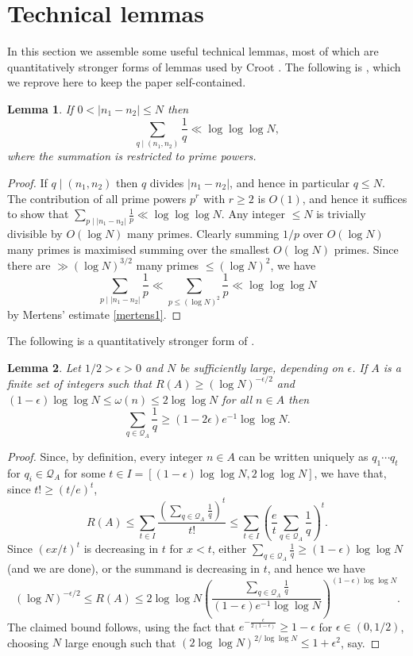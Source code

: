 \documentclass{amsart}
\newcommand{\abs}[1]{\left\lvert #1\right\rvert}
\newcommand{\brac}[1]{\left( #1\right)}
\newtheorem{lemma}{Lemma}
\begin{document}
\section{Technical lemmas}
In this section we assemble some useful technical lemmas, most of which are quantitatively stronger forms of lemmas used by Croot \cite{Cr2003}. The following is \cite[Lemma 2]{Cr2003}, which we reprove here to keep the paper self-contained.
\begin{lemma}\label{lem-basic}
If $0<\abs{n_1-n_2}\leq N$ then
\[\sum_{q\mid (n_1,n_2)}\frac{1}{q}\ll \log\log\log N,\]
where the summation is restricted to prime powers.
\end{lemma}
\begin{proof}
If $q\mid (n_1,n_2)$ then $q$ divides $\abs{n_1-n_2}$, and hence in particular $q\leq N$. The contribution of all prime powers $p^r$ with $r\geq 2$ is $O(1)$, and hence it suffices to show that $\sum_{p\mid \abs{n_1-n_2}}\frac{1}{p}\ll \log\log\log N$. Any integer $\leq N$ is trivially divisible by $O(\log N)$ many primes. Clearly summing $1/p$ over $O(\log N)$ many primes is maximised summing over the smallest $O(\log N)$ primes. Since there are $\gg (\log N)^{3/2}$ many primes $\leq (\log N)^2$, we have
\[\sum_{p\mid \abs{n_1-n_2}}\frac{1}{p}\ll \sum_{p\leq (\log N)^2}\frac{1}{p}\ll \log\log\log N\]
by Mertens' estimate \eqref{mertens1}.
\end{proof}
The following is a quantitatively stronger form of \cite[Lemma 3]{Cr2003}.
\begin{lemma}\label{lem-rtop}
Let $1/2>\epsilon>0$ and $N$ be sufficiently large, depending on $\epsilon$. If $A$ is a finite set of integers such that $R(A)\geq (\log N)^{-\epsilon/2}$ and $(1-\epsilon)\log\log N\leq \omega(n)\leq  2\log\log N$ for all $n\in A$ then 
\[\sum_{q\in\mathcal{Q}_A}\frac{1}{q} \geq (1-2\epsilon)e^{-1}\log\log N.\]
\end{lemma}
\begin{proof}
Since, by definition, every integer $n\in A$ can be written uniquely as $q_1\cdots q_t$ for $q_i\in \mathcal{Q}_A$ for some $t\in I = [(1-\epsilon)\log\log N, 2\log\log N]$, we have that, since $t!\geq (t/e)^t$, 
\[R(A)\leq  \sum_{t\in I}\frac{\brac{\sum_{q\in \mathcal{Q}_A}\frac{1}{q}}^t}{t!}\leq \sum_{t\in I}\brac{\frac{e}{t}\sum_{q\in \mathcal{Q}_A}\frac{1}{q}}^t.\]
Since $(ex/t)^t$ is decreasing in $t$ for $x<t$, either $\sum_{q\in \mathcal{Q}_A}\frac{1}{q}\geq (1-\epsilon)\log\log N$ (and we are done), or the summand is decreasing in $t$, and hence we have
\[(\log N)^{-\epsilon/2}\leq R(A)\leq 2\log\log N\brac{\frac{\sum_{q\in \mathcal{Q}_A}\frac{1}{q}}{(1-\epsilon)e^{-1}\log\log N}}^{(1-\epsilon)\log\log N}.\]
The claimed bound follows, using the fact that $e^{-\frac{\epsilon}{2(1-\epsilon)}}\geq 1-\epsilon$ for $\epsilon\in (0,1/2)$, choosing $N$ large enough such that $(2\log\log N)^{2/\log\log N}\leq 1+\epsilon^2$, say. 
\end{proof}
\end{document}
